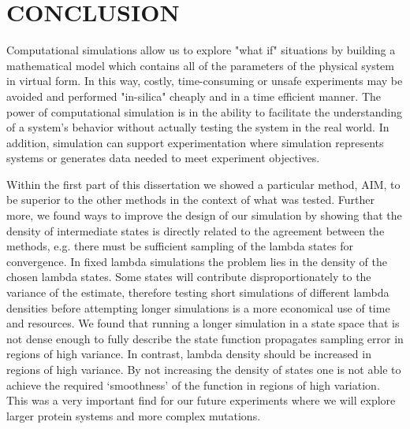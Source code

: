 \clearpage
\section*{CONCLUSION}

Computational simulations allow us to explore "what if" situations by building a mathematical model which contains all of the parameters of the physical system in virtual form. In this way, costly, time-consuming or unsafe experiments may be avoided and performed "in-silica" cheaply and in a time efficient manner. The power of computational simulation is in the ability to facilitate the understanding of a system's behavior without actually testing the system in the real world. In addition, simulation can support experimentation where simulation represents systems or generates data needed to meet experiment objectives. 

Within the first part of this dissertation we showed a particular method, AIM, to be superior to the other methods in the context of what was tested. Further more, we found ways to improve the design of our simulation by showing that the density of intermediate states is directly related to the agreement between the methods, e.g. there must be sufficient sampling of the lambda states for convergence. In fixed lambda simulations the problem lies in the density of the chosen lambda states. Some states will contribute disproportionately to the variance of the estimate, therefore testing short simulations of different lambda densities before attempting longer simulations is a more economical use of time and resources. We found that running a longer simulation in a state space that is not dense enough to fully describe the state function propagates sampling error in regions of high variance. In contrast, lambda density should be increased in regions of high variance. By not increasing the density of states one is not able to achieve the required  ‘smoothness’ of the function in regions of high variation. This was a very important find for our future experiments where we will explore larger protein systems and more complex mutations.

